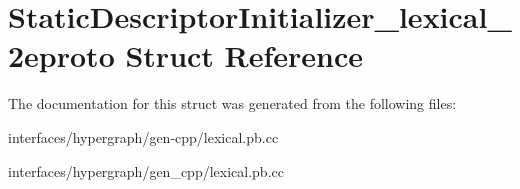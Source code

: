 \hypertarget{structStaticDescriptorInitializer__lexical__2eproto}{
\section{StaticDescriptorInitializer\_\-lexical\_\-2eproto Struct Reference}
\label{structStaticDescriptorInitializer__lexical__2eproto}
}


The documentation for this struct was generated from the following files:\begin{DoxyCompactItemize}
\item 
interfaces/hypergraph/gen-\/cpp/lexical.pb.cc\item 
interfaces/hypergraph/gen\_\-cpp/lexical.pb.cc\end{DoxyCompactItemize}
